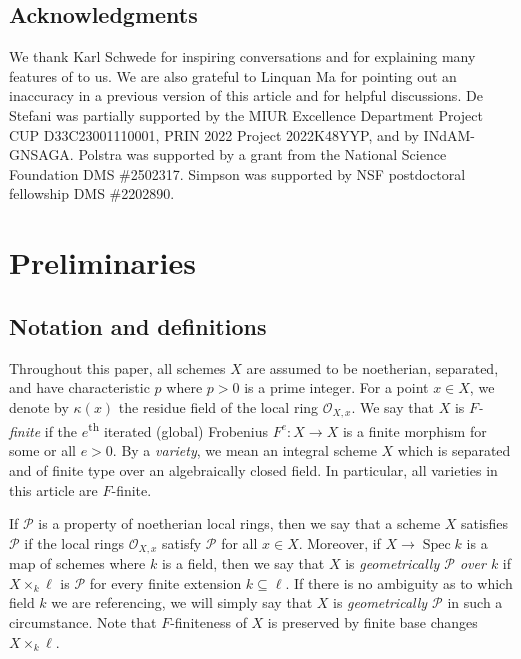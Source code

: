\documentclass[reqno,11pt]{amsart}
\numberwithin{equation}{section}
\theoremstyle{definition}
\theoremstyle{definition}
\theoremstyle{definition}
\theoremstyle{remark}
\newcommand{\Spec}{\operatorname{Spec}}
\newcommand{\ts}{\textsuperscript}
\newcommand{\cO}{\mathcal{O}}
\newcommand{\cP}{\mathcal{P}}
\begin{document}
\subsection*{Acknowledgments} We thank Karl Schwede for inspiring conversations and for explaining many features of \cite{PSZ18} to us. We are also grateful to Linquan Ma for pointing out an inaccuracy in a previous version of this article and for helpful discussions. De Stefani was partially supported by the MIUR Excellence Department Project CUP D33C23001110001, PRIN 2022 Project 2022K48YYP, and by INdAM-GNSAGA. Polstra was supported by a grant from the National Science Foundation DMS \#2502317. Simpson was supported by NSF postdoctoral fellowship DMS \#2202890.

\section{Preliminaries}
\subsection{Notation and definitions}
Throughout this paper, all schemes $X$ are assumed to be noetherian, separated, and have characteristic $p$ where $p>0$ is a prime integer. For a point $x\in X$, we denote by $\kappa(x)$ the residue field of the local ring $\cO_{X,x}$. We say that $X$ is \emph{$F$-finite} if the $e$\ts{th} iterated (global) Frobenius $F^e\colon X\to X$ is a finite morphism for some or all $e>0$. By a \emph{variety}, we mean an integral scheme $X$ which is separated and of finite type over an algebraically closed field. In particular, all varieties in this article are $F$-finite.

If $\cP$ is a property of noetherian local rings, then we say that a scheme $X$ satisfies $\cP$ if the local rings $\cO_{X,x}$ satisfy $\cP$ for all $x\in X$. Moreover, if $X\to\Spec k$ is a map of schemes where $k$ is a field, then we say that $X$ is \emph{geometrically $\cP$ over $k$} if $X\times_k \ell$ is $\cP$ for every finite extension $k\subseteq \ell$. If there is no ambiguity as to which field $k$ we are referencing, we will simply say that $X$ is \emph{geometrically $\cP$} in such a circumstance. Note that $F$-finiteness of $X$ is preserved by finite base changes $X\times_k \ell$.
\end{document}
